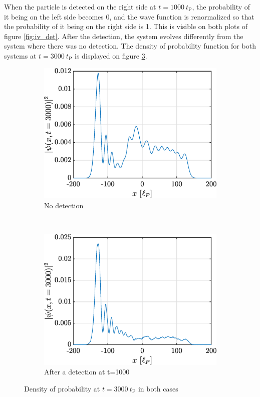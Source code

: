 \documentclass[a4paper,12pt,twoside]{article}
\begin{document}
When the particle is detected on the right side at $t=1000~t_\text{P}$, the probability of it being on the left side becomes 0, and the wave function is renormalized so that the probability of it being on the right side is 1. This is visible on both plots of figure \ref{fig:iv_det}. After the detection, the system evolves differently from the system where there was no detection.
The density of probability function for both systems at $t=3000~t_\text{P}$ is displayed on figure \ref{fig:iv_3000}.

\begin{figure}[h]
        \centering
        \begin{subfigure}[t]{0.45\textwidth}
          \includegraphics[width=\textwidth]{graphs/iv_neg_3000.eps}
          \caption{No detection}
          \label{fig:iv_neg_3000}
        \end{subfigure}
        ~
        \begin{subfigure}[t]{0.45\textwidth}
          \includegraphics[width=\textwidth]{graphs/iv_det_3000.eps}
          \caption{After a detection at t=1000}
          \label{fig:iv_det_3000}
        \end{subfigure}
        \caption{Density of probability at $t=3000~t_\text{P}$ in both cases}
        \label{fig:iv_3000}
\end{figure}
\end{document}
